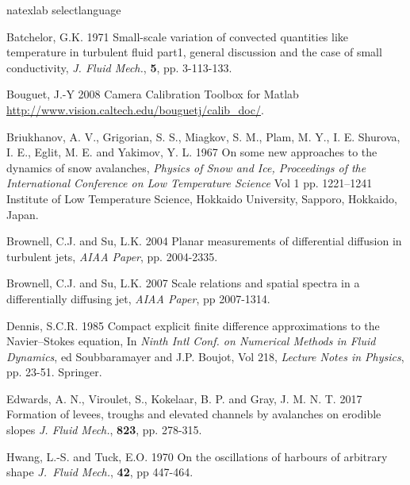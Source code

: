 \documentclass[lineno]{JFM-FLM_Au}
\begin{document}


\begin{thebibliography}{}
\expandafter\ifx\csname natexlab\endcsname\relax
\def\natexlab#1{#1}\fi
\expandafter\ifx\csname selectlanguage\endcsname\relax
\def\selectlanguage#1{\relax}\fi

{\sc Batchelor, G.K.} 1971 {Small-scale variation of convected quantities like temperature in turbulent fluid part1, general discussion and the case of small conductivity}, {\it J. Fluid Mech.}, {\bf 5}, pp. 3-113-133.

{\sc Bouguet, J.-Y} 2008 Camera Calibration Toolbox for Matlab {\url{http://www.vision.caltech.edu/bouguetj/calib_doc/}}.

{\sc Briukhanov, A. V.,   Grigorian, S. S., Miagkov,  S. M., Plam, M. Y.,   I. E. Shurova, I. E.,   Eglit, M. E. and Yakimov, Y. L.} 1967
{On some new approaches to the dynamics of snow avalanches},
{\it Physics of Snow and Ice,  Proceedings of the International Conference on Low Temperature Science}
{Vol 1} pp. 1221--1241 {Institute of Low Temperature Science, Hokkaido University, Sapporo, Hokkaido, Japan}.

 {\sc Brownell,  C.J.  and Su,  L.K.} 2004  {Planar measurements of differential diffusion in turbulent jets}, {\it AIAA Paper},  pp. 2004-2335.

  {\sc Brownell, C.J. and  Su, L.K.} 2007 {Scale relations and spatial spectra in a differentially diffusing jet}, {\it AIAA Paper}, pp 2007-1314.

 {\sc  Dennis, S.C.R.} 1985 {Compact explicit finite difference approximations to the Navier--Stokes equation},  { In \it Ninth Intl Conf. on Numerical Methods in Fluid Dynamics},  {ed Soubbaramayer and J.P. Boujot},  {Vol 218}, {\it Lecture Notes in Physics}, pp. 23-51. Springer.

{\sc Edwards, A. N., Viroulet, S., Kokelaar, B. P. and Gray, J. M. N. T.} 2017 Formation of levees, troughs and elevated channels by avalanches on erodible slopes {\it J. Fluid Mech.}, {\bf 823}, pp. 278-315.

 {\sc Hwang,  L.-S.  and  Tuck, E.O.} 1970 On the oscillations of harbours of arbitrary shape {\it J.~Fluid Mech.}, {\bf42}, pp 447-464.


\end{thebibliography}
\end{document}
